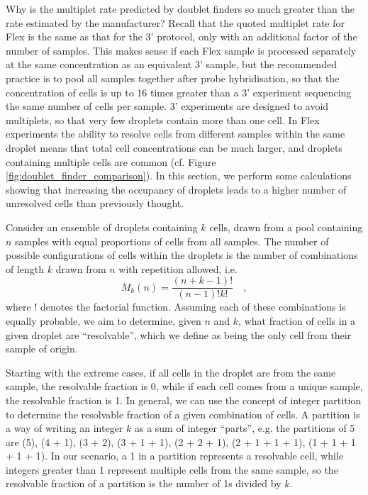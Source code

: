 \documentclass[unnumsec,webpdf,modern,large]{oup-authoring-template}
\begin{document}
	Why is the multiplet rate predicted by doublet finders so much greater than the rate estimated by the manufacturer? 
	Recall that the quoted multiplet rate for Flex is the same as that for the 3' protocol, only with an additional factor of the number of samples. 
	This makes sense if each Flex sample is processed separately at the same concentration as an equivalent 3' sample, but the recommended practice is to pool all samples together after probe hybridisation, so that the concentration of cells is up to 16 times greater than a 3' experiment sequencing the same number of cells per sample. 
	3' experiments are designed to avoid multiplets, so that very few droplets contain more than one cell. 
	In Flex experiments the ability to resolve cells from different samples within the same droplet means that total cell concentrations can be much larger, and droplets containing multiple cells are common (cf. Figure \ref{fig:doublet_finder_comparison}). 
	In this section, we perform some calculations showing that increasing the occupancy of droplets leads to a higher number of unresolved cells than previously thought.
	
	Consider an ensemble of droplets containing $k$ cells, drawn from a pool containing $n$ samples with equal proportions of cells from all samples. 
	The number of possible configurations of cells within the droplets is the number of combinations of length $k$ drawn from $n$ with repetition allowed, i.e. 
	\begin{equation}
		M_k(n) = \frac{(n + k - 1)!}{(n - 1)! k!} \quad ,
		\label{eq:multiplet_configurations}
	\end{equation}
	where $!$ denotes the factorial function. 
	Assuming each of these combinations is equally probable, we aim to determine, given $n$ and $k$, what fraction of cells in a given droplet are ``resolvable'', which we define as being the only cell from their sample of origin.
	
	Starting with the extreme cases, if all cells in the droplet are from the same sample, the resolvable fraction is 0, while if each cell comes from a unique sample, the resolvable fraction is 1. 
	In general, we can use the concept of integer partition to determine the resolvable fraction of a given combination of cells. A partition is a way of writing an integer $k$ as a sum of integer ``parts'', e.g. the partitions of 5 are (5), (4 + 1), (3 + 2), (3 + 1 + 1), (2 + 2 + 1), (2 + 1 + 1 + 1), (1 + 1 + 1 + 1 + 1).
	In our scenario, a 1 in a partition represents a resolvable cell, while integers greater than 1 represent multiple cells from the same sample, so the resolvable fraction of a partition is the number of 1s divided by $k$.
	
\end{document}
